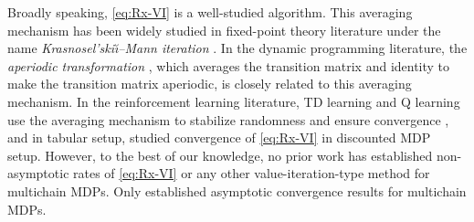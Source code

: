 \documentclass{article} %
\begin{document}
Broadly speaking, \ref{eq:Rx-VI} is a well-studied algorithm. This averaging mechanism has been widely studied in fixed-point theory literature under the name \emph{Krasnosel'ski\u{\i}--Mann iteration} \citep{mann1953mean, krasnosel1955two, bauschke2017correction, baillon1992optimal, cominetti2014rate}. In the dynamic programming literature, the \emph{aperiodic transformation} \cite[Section 8.5.4]{10.5555/528623}, which averages the transition matrix and identity to make the transition matrix aperiodic, is closely related to this averaging mechanism. In the reinforcement learning literature, TD learning and Q learning use the averaging mechanism to stabilize randomness and ensure convergence \citep{Sutton1988, Watkins1989, bertsekas1995neuro, bravo2024stochastic}, and in tabular setup, \citet{kushner1971accelerated, porteus1978accelerated, goyal2022first, doi:10.1137/20M1367192} studied convergence of \ref{eq:Rx-VI} in discounted MDP setup. However, to the best of our knowledge, no prior work has established non-asymptotic rates of \ref{eq:Rx-VI} or any other value-iteration-type method for multichain MDPs. Only \citet{schweitzer1977asymptotic, schweitzer1979geometric} established asymptotic convergence results for multichain MDPs.



\end{document}
